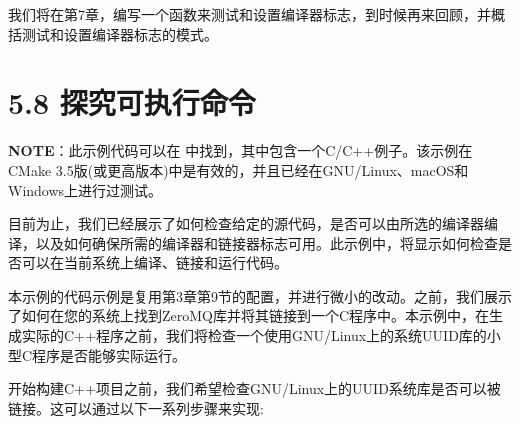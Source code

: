 
我们将在第7章，编写一个函数来测试和设置编译器标志，到时候再来回顾，并概括测试和设置编译器标志的模式。


\section{5.8 探究可执行命令}

\begin{myInfoBox}
\textbf{NOTE}：此示例代码可以在  中找到，其中包含一个C/C++例子。该示例在CMake 3.5版(或更高版本)中是有效的，并且已经在GNU/Linux、macOS和Windows上进行过测试。
\end{myInfoBox}

目前为止，我们已经展示了如何检查给定的源代码，是否可以由所选的编译器编译，以及如何确保所需的编译器和链接器标志可用。此示例中，将显示如何检查是否可以在当前系统上编译、链接和运行代码。


本示例的代码示例是复用第3章第9节的配置，并进行微小的改动。之前，我们展示了如何在您的系统上找到ZeroMQ库并将其链接到一个C程序中。本示例中，在生成实际的C++程序之前，我们将检查一个使用GNU/Linux上的系统UUID库的小型C程序是否能够实际运行。


开始构建C++项目之前，我们希望检查GNU/Linux上的UUID系统库是否可以被链接。这可以通过以下一系列步骤来实现:

